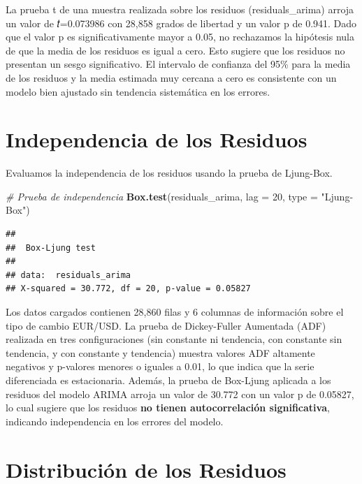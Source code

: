 \documentclass[
]{book}
\newenvironment{Shaded}{\begin{snugshade}}{\end{snugshade}}
\newcommand{\AttributeTok}[1]{\textcolor[rgb]{0.13,0.29,0.53}{#1}}
\newcommand{\CommentTok}[1]{\textcolor[rgb]{0.56,0.35,0.01}{\textit{#1}}}
\newcommand{\DecValTok}[1]{\textcolor[rgb]{0.00,0.00,0.81}{#1}}
\newcommand{\FunctionTok}[1]{\textcolor[rgb]{0.13,0.29,0.53}{\textbf{#1}}}
\newcommand{\NormalTok}[1]{#1}
\newcommand{\StringTok}[1]{\textcolor[rgb]{0.31,0.60,0.02}{#1}}
\begin{document}
La prueba t de una muestra realizada sobre los residuos (residuals\_arima) arroja un valor de 𝑡=0.073986 con 28,858 grados de libertad y un valor p de 0.941. Dado que el valor p es significativamente mayor a 0.05, no rechazamos la hipótesis nula de que la media de los residuos es igual a cero. Esto sugiere que los residuos no presentan un sesgo significativo. El intervalo de confianza del 95\% para la media de los residuos y la media estimada muy cercana a cero es consistente con un modelo bien ajustado sin tendencia sistemática en los errores.

\section{Independencia de los Residuos}\label{independencia-de-los-residuos}

Evaluamos la independencia de los residuos usando la prueba de Ljung-Box.

\begin{Shaded}
\begin{Highlighting}[]
\CommentTok{\# Prueba de independencia}
\FunctionTok{Box.test}\NormalTok{(residuals\_arima, }\AttributeTok{lag =} \DecValTok{20}\NormalTok{, }\AttributeTok{type =} \StringTok{"Ljung{-}Box"}\NormalTok{)}
\end{Highlighting}
\end{Shaded}

\begin{verbatim}
## 
##  Box-Ljung test
## 
## data:  residuals_arima
## X-squared = 30.772, df = 20, p-value = 0.05827
\end{verbatim}

Los datos cargados contienen 28,860 filas y 6 columnas de información sobre el tipo de cambio EUR/USD. La prueba de Dickey-Fuller Aumentada (ADF) realizada en tres configuraciones (sin constante ni tendencia, con constante sin tendencia, y con constante y tendencia) muestra valores ADF altamente negativos y p-valores menores o iguales a 0.01, lo que indica que la serie diferenciada es estacionaria. Además, la prueba de Box-Ljung aplicada a los residuos del modelo ARIMA arroja un valor de 30.772 con un valor p de 0.05827, lo cual sugiere que los residuos \textbf{no tienen autocorrelación significativa}, indicando independencia en los errores del modelo.

\section{Distribución de los Residuos}\label{distribuciuxf3n-de-los-residuos}
\end{document}

